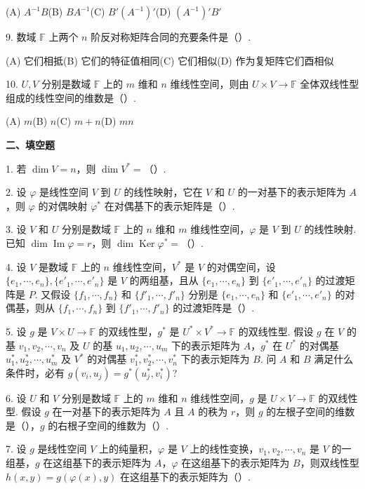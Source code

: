 \documentclass[UTF8,12pt,a4paper,fontset=fandol]{ctexart}
\begin{document}
(A) $A^{-1}B$\quad (B) $BA^{-1}$\quad (C) $B'(A^{-1})'$\quad (D) $(A^{-1})'B'$

9. 数域 $\mathbb{F}$ 上两个 $n$ 阶反对称矩阵合同的充要条件是（\quad ）.

(A) 它们相抵\quad (B) 它们的特征值相同\quad (C) 它们相似\quad (D) 作为复矩阵它们酉相似

10. $U,V$ 分别是数域 $\mathbb{F}$ 上的 $m$ 维和 $n$ 维线性空间，则由 $U\times V\to\mathbb{F}$ 全体双线性型组成的线性空间的维数是（\quad ）.

(A) $m$\quad (B) $n$\quad (C) $m+n$\quad (D) $mn$

\noindent\textbf{二、填空题}

1. 若 $\dim V=n$，则 $\dim V^*=$（\quad ）.

2. 设 $\varphi$ 是线性空间 $V$ 到 $U$ 的线性映射，它在 $V$ 和 $U$ 的一对基下的表示矩阵为 $A$，则 $\varphi$ 的对偶映射 $\varphi^*$ 在对偶基下的表示矩阵是（\quad ）.

3. 设 $V$ 和 $U$ 分别是数域 $\mathbb{F}$ 上的 $n$ 维和 $m$ 维线性空间，$\varphi$ 是 $V$ 到 $U$ 的线性映射. 已知 $\dim\operatorname{Im}\varphi=r$，则 $\dim\operatorname{Ker}\varphi^*=$（\quad ）.

4. 设 $V$ 是数域 $\mathbb{F}$ 上的 $n$ 维线性空间，$V^*$ 是 $V$ 的对偶空间，设 $\{e_1,\cdots,e_n\},\{e'_1,\cdots,e'_n\}$ 是 $V$ 的两组基，且从 $\{e_1,\cdots,e_n\}$ 到 $\{e'_1,\cdots,e'_n\}$ 的过渡矩阵是 $P$. 又假设 $\{f_1,\cdots,f_n\}$ 和 $\{f'_1,\cdots,f'_n\}$ 分别是 $\{e_1,\cdots,e_n\}$ 和 $\{e'_1,\cdots,e'_n\}$ 的对偶基，则从 $\{f_1,\cdots,f_n\}$ 到 $\{f'_1,\cdots,f'_n\}$ 的过渡矩阵是（\quad ）.

5. 设 $g$ 是 $V\times U\to\mathbb{F}$ 的双线性型，$g^*$ 是 $U^*\times V^*\to\mathbb{F}$ 的双线性型. 假设 $g$ 在 $V$ 的基 $v_1,v_2,\cdots,v_n$ 及 $U$ 的基 $u_1,u_2,\cdots,u_m$ 下的表示矩阵为 $A$，$g^*$ 在 $U^*$ 的对偶基 $u_1^*,u_2^*,\cdots,u_m^*$ 及 $V^*$ 的对偶基 $v_1^*,v_2^*,\cdots,v_n^*$ 下的表示矩阵为 $B$. 问 $A$ 和 $B$ 满足什么条件时，必有 $g(v_i,u_j)=g^*(u_j^*,v_i^*)$?

6. 设 $U$ 和 $V$ 分别是数域 $\mathbb{F}$ 上的 $m$ 维和 $n$ 维线性空间，$g$ 是 $U\times V\to\mathbb{F}$ 的双线性型. 假设 $g$ 在一对基下的表示矩阵为 $A$ 且 $A$ 的秩为 $r$，则 $g$ 的左根子空间的维数是（\quad ），$g$ 的右根子空间的维数为（\quad ）.

7. 设 $g$ 是线性空间 $V$ 上的纯量积，$\varphi$ 是 $V$ 上的线性变换，$v_1,v_2,\cdots,v_n$ 是 $V$ 的一组基，$g$ 在这组基下的表示矩阵为 $A$，$\varphi$ 在这组基下的表示矩阵为 $B$，则双线性型 $h(x,y)=g(\varphi(x),y)$ 在这组基下的表示矩阵为（\quad ）.
\end{document}
